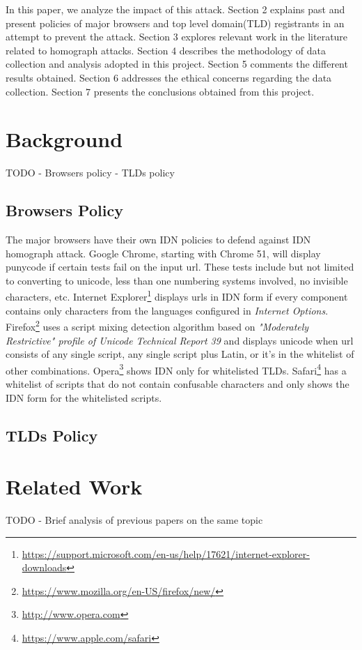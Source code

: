 \documentclass[letterpaper,twocolumn,10pt]{article}
\begin{document}
In this paper, we analyze the impact of this attack.
Section 2 explains past and present policies of major browsers and top level domain(TLD) registrants in an attempt to prevent the attack.
Section 3 explores relevant work in the literature related to homograph attacks.
Section 4 describes the methodology of data collection and analysis adopted in this project.
Section 5 comments the different results obtained.
Section 6 addresses the ethical concerns regarding the data collection.
Section 7 presents the conclusions obtained from this project.

\section{Background}
TODO
- Browsers policy
- TLDs policy

\subsection{Browsers Policy}
The major browsers have their own IDN policies to defend against IDN homograph attack.
Google Chrome, starting with Chrome 51, will display punycode if certain tests fail on the input url.
These tests include but not limited to converting to unicode, less than one numbering systems involved, no invisible characters, etc.
Internet Explorer\footnote{\url{https://support.microsoft.com/en-us/help/17621/internet-explorer-downloads}} displays urls in IDN form if every component contains only characters from the languages configured in \textit{Internet Options}.
Firefox\footnote{\url{https://www.mozilla.org/en-US/firefox/new/}} uses a script mixing detection algorithm based on \textit{"Moderately Restrictive" profile of Unicode Technical Report 39} and displays unicode when url consists of any single script, any single script plus Latin, or it's in the whitelist of other combinations.
Opera\footnote{\url{http://www.opera.com}} shows IDN only for whitelisted TLDs.
Safari\footnote{\url{https://www.apple.com/safari}} has a whitelist of scripts that do not contain confusable characters and only shows the IDN form for the whitelisted scripts.

\subsection{TLDs Policy}

\section{Related Work}
TODO
- Brief analysis of previous papers on the same topic
\end{document}
